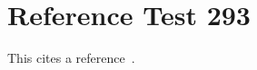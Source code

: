\documentclass{article}
\begin{document}
\section{Reference Test 293}
This cites a reference~\cite{test293}.

\end{document}
